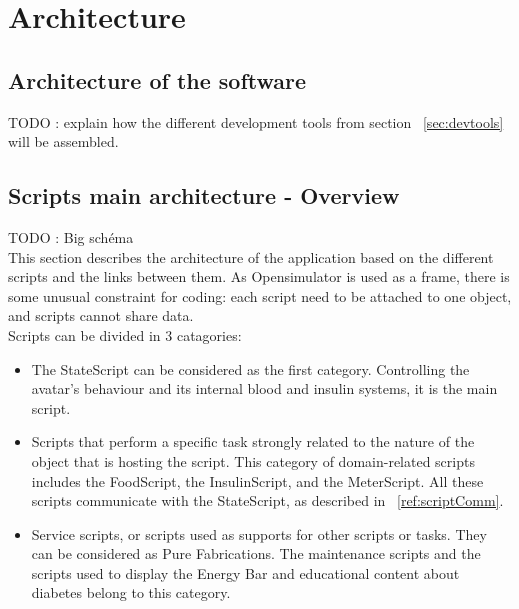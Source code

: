 \section{Architecture}

\subsection{Architecture of the software}
TODO : explain how the different development tools from section ~\ref{sec:devtools} will be assembled.


\subsection{Scripts main architecture - Overview}
TODO : Big schéma\\

This section describes the architecture of the application based on the different scripts and the links between them.
As Opensimulator is used as a frame, there is some unusual constraint for coding: each script need to be attached to one object, and scripts cannot share data. \\

Scripts can be divided in 3 catagories:
\begin{itemize}
\item The StateScript can be considered as the first category. Controlling the avatar's behaviour and its internal blood and insulin systems, it is the main script.
\item Scripts that perform a specific task strongly related to the nature of the object that is hosting the script. This category of domain-related scripts includes the FoodScript, the InsulinScript, and the MeterScript. All these scripts communicate with the StateScript, as described in ~\ref{ref:scriptComm}.
\item Service scripts, or scripts used as supports for other scripts or tasks. They can be considered as Pure Fabrications. The maintenance scripts and the scripts used to display the Energy Bar and educational content about diabetes belong to this category.
\end{itemize}